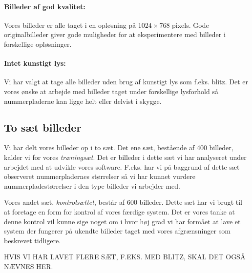 \paragraph{Billeder af god kvalitet:}
Vores billeder er alle taget i en opløsning på $1024 \times 768$ pixels. Gode originalbilleder giver gode muligheder for at eksperimentere med billeder i forskellige opløsninger. 

\paragraph{Intet kunstigt lys:}
Vi har valgt at tage alle billeder uden brug af kunstigt lys som f.eks. blitz. Det er vores ønske at arbejde med billeder taget under forskellige lysforhold så nummerpladerne kan ligge helt eller delvist i skygge.  

\subsection{To sæt billeder}
Vi har delt vores billeder op i to sæt. Det ene sæt, bestående af 400 billeder, kalder vi for vores \textit{træningsæt}. Det er billeder i dette sæt vi har analyseret under arbejdet med at udvikle vores software. F.eks. har vi på baggrund af dette sæt observeret nummerpladernes størrelser så vi har kunnet vurdere nummerpladestørrelser i den type billeder vi arbejder med.

Vores andet sæt, \textit{kontrolsættet}, består af 600 billeder. Dette sæt har vi brugt til at foretage en form for kontrol af vores færdige system. Det er vores tanke at denne kontrol vil kunne sige noget om i hvor høj grad vi har formået at lave et system der fungerer på ukendte billeder taget med vores afgrænsninger som beskrevet tidligere. 

HVIS VI HAR LAVET FLERE SÆT, F.EKS. MED BLITZ, SKAL DET OGSÅ NÆVNES HER.

